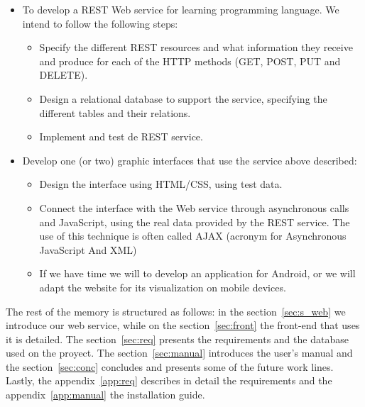 \begin{itemize}
\item
To develop a REST Web service for learning programming language. We intend to follow the following steps:

\begin{itemize}
\item
Specify the different REST resources and what information they receive and produce for each of the HTTP methods (GET, POST, PUT and DELETE).

\item
Design a relational database to support the service, specifying the different tables and their relations.

\item
Implement and test de REST service.

\end{itemize}

\item
Develop one (or two) graphic interfaces that use the service above described:

\begin{itemize}
\item
Design the interface using HTML/CSS, using test data.

\item
Connect the interface with the Web service through asynchronous calls and JavaScript, using the real data provided by the REST service. The use of this technique is often called AJAX (acronym for Asynchronous JavaScript And XML)

\item
If we have time we will to develop an application for Android, or we will adapt the website for its visualization on mobile devices.

\end{itemize}

\end{itemize}

The rest of the memory is structured as follows: in the section~\ref{sec:s_web} we introduce our web service, while on the section~\ref{sec:front} the front-end that uses it is detailed.
The section~\ref{sec:req} presents the requirements and the database used on the proyect. The section~\ref{sec:manual} introduces the user's manual and the section~\ref{sec:conc} concludes and presents some of the future work lines.
Lastly, the appendix~\ref{app:req} describes in detail the requirements and the appendix~\ref{app:manual} the installation guide.